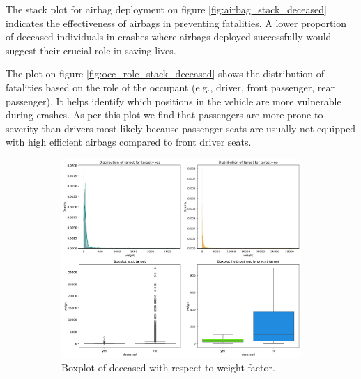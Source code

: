 \documentclass[12pt,a4paper]{article}
\begin{document}
The stack plot for airbag deployment on figure \ref{fig:airbag_stack_deceased} indicates the effectiveness of airbags in preventing fatalities. A lower proportion of deceased individuals in crashes where airbags deployed successfully would suggest their crucial role in saving lives.

The plot on figure \ref{fig:occ_role_stack_deceased} shows the distribution of fatalities based on the role of the occupant (e.g., driver, front passenger, rear passenger). It helps identify which positions in the vehicle are more vulnerable during crashes. As per this plot we find that passengers are more prone to severity than drivers most likely because passenger seats are usually not equipped with high efficient airbags compared to front driver seats.
	\begin{figure}[h]
		\centering
		\begin{subfigure}[t]{0.495\linewidth}
			\centering
			\includegraphics[width=\linewidth]{weight_target.png}
			\caption{Boxplot of deceased with respect to weight factor.}
			\label{fig:weight_factor}
		\end{subfigure}
		\hfill
		\begin{subfigure}[t]{0.495\linewidth}
			\centering

\end{subfigure}
\end{figure}
\end{document}
